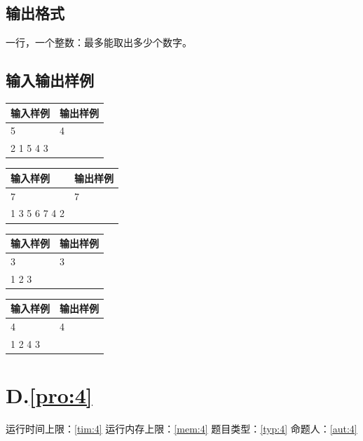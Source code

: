 \documentclass[
	lang=cn,
	color=green
]{elegantbook}
\begin{document}
\section*{输出格式}
一行，一个整数：最多能取出多少个数字。

\section*{输入输出样例}
\begin{tabularx}{450pt}{X|X}
	\toprule
	输入样例  & 输出样例 \\
	\midrule
	5         & 4        \\
	2 1 5 4 3 &          \\
	\bottomrule
\end{tabularx}
\vspace{0.5cm}

\begin{tabularx}{450pt}{X|X}
	\toprule
	输入样例      & 输出样例 \\
	\midrule
	7             & 7        \\
	1 3 5 6 7 4 2 &          \\
	\bottomrule
\end{tabularx}
\vspace{0.5cm}

\begin{tabularx}{450pt}{X|X}
	\toprule
	输入样例 & 输出样例 \\
	\midrule
	3        & 3        \\
	1 2 3    &          \\
	\bottomrule
\end{tabularx}
\vspace{0.5cm}

\begin{tabularx}{450pt}{X|X}
	\toprule
	输入样例 & 输出样例 \\
	\midrule
	4        & 4        \\
	1 2 4 3  &          \\
	\bottomrule
\end{tabularx}

\newpage
\chapter*{D.\quad  \ref*{pro:4}}
\begin{center}
	运行时间上限：\ref*{tim:4} \quad 运行内存上限：\ref*{mem:4} \quad 题目类型：\ref*{typ:4} \quad 命题人：\ref*{aut:4}
\end{center}
\end{document}
